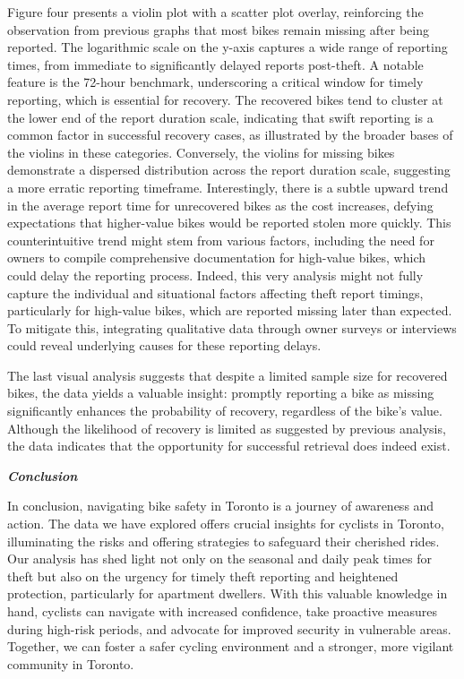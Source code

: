 \documentclass[
  11pt,
]{article}
\begin{document}
\indent Figure four presents a violin plot with a scatter plot overlay,
reinforcing the observation from previous graphs that most bikes remain
missing after being reported. The logarithmic scale on the y-axis
captures a wide range of reporting times, from immediate to
significantly delayed reports post-theft. A notable feature is the
72-hour benchmark, underscoring a critical window for timely reporting,
which is essential for recovery. The recovered bikes tend to cluster at
the lower end of the report duration scale, indicating that swift
reporting is a common factor in successful recovery cases, as
illustrated by the broader bases of the violins in these categories.
Conversely, the violins for missing bikes demonstrate a dispersed
distribution across the report duration scale, suggesting a more erratic
reporting timeframe. Interestingly, there is a subtle upward trend in
the average report time for unrecovered bikes as the cost increases,
defying expectations that higher-value bikes would be reported stolen
more quickly. This counterintuitive trend might stem from various
factors, including the need for owners to compile comprehensive
documentation for high-value bikes, which could delay the reporting
process. Indeed, this very analysis might not fully capture the
individual and situational factors affecting theft report timings,
particularly for high-value bikes, which are reported missing later than
expected. To mitigate this, integrating qualitative data through owner
surveys or interviews could reveal underlying causes for these reporting
delays.

\indent The last visual analysis suggests that despite a limited sample
size for recovered bikes, the data yields a valuable insight: promptly
reporting a bike as missing significantly enhances the probability of
recovery, regardless of the bike's value. Although the likelihood of
recovery is limited as suggested by previous analysis, the data
indicates that the opportunity for successful retrieval does indeed
exist.

\newpage

\textbf{\emph{Conclusion}}

\indent In conclusion, navigating bike safety in Toronto is a journey of
awareness and action. The data we have explored offers crucial insights
for cyclists in Toronto, illuminating the risks and offering strategies
to safeguard their cherished rides. Our analysis has shed light not only
on the seasonal and daily peak times for theft but also on the urgency
for timely theft reporting and heightened protection, particularly for
apartment dwellers. With this valuable knowledge in hand, cyclists can
navigate with increased confidence, take proactive measures during
high-risk periods, and advocate for improved security in vulnerable
areas. Together, we can foster a safer cycling environment and a
stronger, more vigilant community in Toronto.
\end{document}
